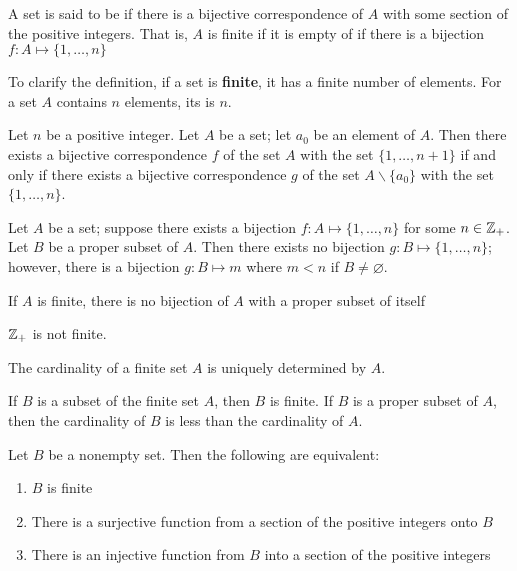 \begin{definition}
A set is said to be \textbf{} if there is a bijective correspondence of $A$ with some section of the positive integers. That is, $A$ is finite if it is empty of if there is a bijection $f: A \mapsto \{1, \dots, n\}$
\end{definition}

To clarify the definition, if a set is \textbf{finite}, it has a finite number of elements. For a set $A$ contains $n$ elements, its \textbf{} is $n$.

\begin{lemmad}
Let $n$ be a positive integer. Let $A$ be a set; let $a_0$ be an element of $A$. Then there exists a bijective correspondence $f$ of the set $A$ with the set $\{1, \dots, n+1\}$ if and only if there exists a bijective correspondence $g$ of the set $A \backslash \{a_0\}$ with the set $\{1, \dots, n\}$.
\end{lemmad}

\begin{theorem}
Let $A$ be a set; suppose there exists a bijection $f: A \mapsto \{1, \dots, n\}$ for some $n \in \mathbb{Z}_+$. Let $B$ be a proper subset of $A$. Then there exists no bijection $g: B \mapsto \{1, \dots, n\}$; however, there is a bijection $g: B \mapsto m$ where $m < n$ if $B \neq \varnothing$.
\end{theorem}

\begin{corollary}
If $A$ is finite, there is no bijection of $A$ with a proper subset of itself
\end{corollary}

\begin{corollary}
$\mathbb{Z}_+$ is not finite.
\end{corollary}

\begin{corollary}
The cardinality of a finite set $A$ is uniquely determined by $A$.
\end{corollary}

\begin{corollary}
If $B$ is a subset of the finite set $A$, then $B$ is finite. If $B$ is a proper subset of $A$, then the cardinality of $B$ is less than the cardinality of $A$.
\end{corollary}

\begin{corollary}
Let $B$ be a nonempty set. Then the following are equivalent:
\begin{enumerate}[itemsep=0pt]
    \item $B$ is finite
    \item There is a surjective function from a section of the positive integers onto $B$
    \item There is an injective function from $B$ into a section of the positive integers
\end{enumerate}
\end{corollary}

